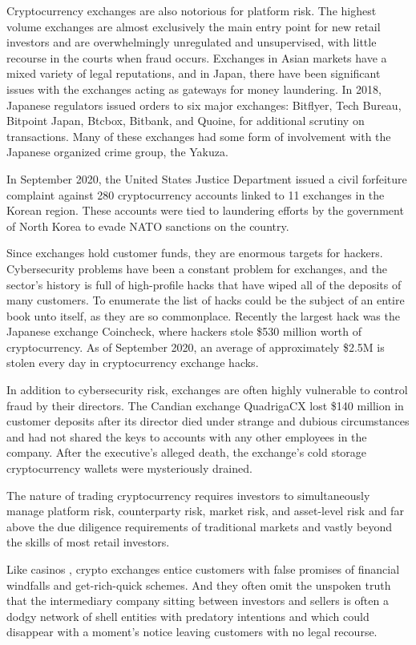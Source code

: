 Cryptocurrency exchanges are also notorious for platform risk. The highest
volume exchanges are almost exclusively the main entry point for new retail
investors and are overwhelmingly unregulated and unsupervised, with little
recourse in the courts when fraud occurs. Exchanges in Asian markets have a
mixed variety of legal reputations, and in Japan, there have been significant
issues with the exchanges acting as gateways for money laundering. In 2018,
Japanese regulators issued orders to six major exchanges: Bitflyer, Tech Bureau,
Bitpoint Japan, Btcbox, Bitbank, and Quoine, for additional scrutiny on
transactions. Many of these exchanges had some form of involvement with the
Japanese organized crime group, the Yakuza.


In September 2020, the United States Justice Department issued a civil
forfeiture complaint against 280 cryptocurrency accounts linked to 11 exchanges
in the Korean region. These accounts were tied to laundering efforts by the
government of North Korea to evade NATO sanctions on the country.


Since exchanges hold customer funds, they are enormous targets for hackers.
\cite{stecklow_chaos_2017} Cybersecurity problems have been a constant problem
for exchanges, and the sector's history is full of high-profile hacks that have
wiped all of the deposits of many customers. To enumerate the list of hacks
could be the subject of an entire book unto itself, as they are so commonplace.
Recently the largest hack was the Japanese exchange Coincheck, where hackers
stole \$530 million worth of cryptocurrency. As of September 2020, an average of
approximately \$2.5M is stolen every day in cryptocurrency exchange hacks.

In addition to cybersecurity risk, exchanges are often highly vulnerable to
control fraud by their directors. The Candian exchange QuadrigaCX lost \$140
million in customer deposits after its director died under strange and dubious
circumstances and had not shared the keys to accounts with any other employees
in the company. After the executive's alleged death, the exchange's cold storage
cryptocurrency wallets were mysteriously drained.


The nature of trading cryptocurrency requires investors to simultaneously manage
platform risk, counterparty risk, market risk, and asset-level risk and far
above the due diligence requirements of traditional markets and vastly beyond
the skills of most retail investors. \cite{roubini_great_2019}

Like casinos \cite{diehl_internets_2021}, crypto exchanges entice customers with
false promises of financial windfalls and get-rich-quick schemes. And they often
omit the unspoken truth that the intermediary company sitting between investors
and sellers is often a dodgy network of shell entities with predatory intentions
and which could disappear with a moment's notice leaving customers with no legal
recourse. \cite{doctorow_when_nodate}
